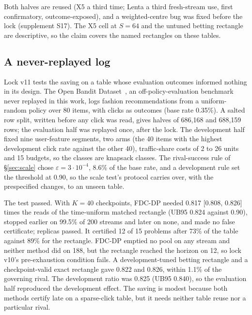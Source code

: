\documentclass[sigconf,anonymous,review]{acmart}
\newcommand{\eps}{\varepsilon}
\begin{document}
Both halves are reused (X5 a third time; Lenta a third fresh-stream use, first confirmatory, outcome-exposed), and a weighted-centre bug was fixed before the lock (supplement S17). The X5 cell at $S = 64$ and the untuned betting rectangle are descriptive, so the claim covers the named rectangles on these tables.

\subsection{A never-replayed log}\label{sec:obd}

Lock v11 tests the saving on a table whose evaluation outcomes informed nothing in its design. The Open Bandit Dataset~\citep{saito2021open}, an off-policy-evaluation benchmark never replayed in this work, logs fashion recommendations from a uniform-random policy over 80 items, with clicks as outcomes (base rate 0.35\%). A salted row split, written before any click was read, gives halves of 686,168 and 688,159 rows; the evaluation half was replayed once, after the lock. The development half fixed nine user-feature segments, two arms (the 40 items with the highest development click rate against the other 40), traffic-share costs of 2 to 26 units and 15 budgets, so the classes are knapsack classes. The rival-success rule of \S\ref{sec:scale} chose $\eps = 3 \cdot 10^{-4}$, 8.6\% of the base rate, and a development rule set the threshold at 0.90, so the scale test's protocol carries over, with the prespecified changes, to an unseen table.

The test passed. With $K = 40$ checkpoints, FDC-DP needed 0.817 [0.808, 0.826] times the reads of the time-uniform matched rectangle (UB95 0.824 against 0.90), stopped earlier on 99.5\% of 200 streams and later on none, and made no false certificate; replicas passed. It certified 12 of 15 problems after 73\% of the table against 89\% for the rectangle. FDC-DP emptied no pool on any stream and neither method did on 188, but the rectangle reached the horizon on 12, so lock v10's pre-exhaustion condition fails. A development-tuned betting rectangle and a checkpoint-valid exact rectangle gave 0.822 and 0.826, within 1.1\% of the governing rival. The development ratio was 0.825 (UB95 0.840), so the evaluation half reproduced the development effect. The saving is modest because both methods certify late on a sparse-click table, but it needs neither table reuse nor a particular rival.
\end{document}
